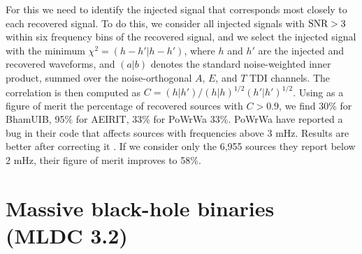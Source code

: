 \documentclass{iopart}
\begin{document}
For this we need to identify the injected signal that corresponds most closely to each recovered signal. To do this, we consider all injected signals with ${\rm SNR} > 3$ within six frequency bins of the recovered signal, and we select the injected signal with the minimum $\chi^2 = (h-h' \vert h-h')$,
where $h$ and $h'$ are the injected and recovered waveforms, and $(a\vert b)$ denotes the standard noise-weighted inner product, summed over the noise-orthogonal $A$, $E$, and $T$ TDI channels. The correlation is then computed as $C = (h \vert h')/
(h \vert h)^{1/2} (h' \vert h')^{1/2}$. Using as a figure of merit the percentage of recovered sources with $C > 0.9$, we find 30\% for BhamUIB, 95\% for AEIRIT, 33\% for PoWrWa 33\%. PoWrWa have reported a bug in their code that affects sources with frequencies above 3 mHz. Results are better after correcting it \cite{babaknew}. If we consider only the 6,955 sources they report below 2 mHz, their figure of merit improves to 58\%.

\section{Massive black-hole binaries (MLDC 3.2)}
\end{document}
